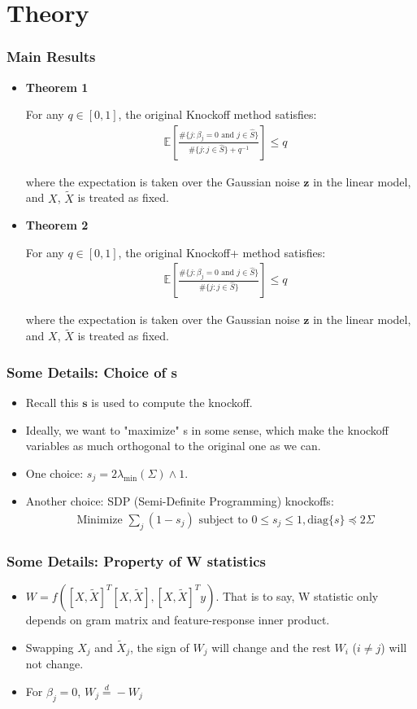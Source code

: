 \documentclass{beamer}
\begin{document}
\section{Theory}
\begin{frame}
\frametitle{Main Results}
\begin{itemize}
	\item \textbf{Theorem 1}
	
	For any $q\in [0,1]$, the original Knockoff method satisfies:
	\begin{align*}
	& \mathbb{E}\left[\frac{\#\{j: \beta_j=0\text{ and }j\in\hat{S} \} }{\#\{j: j\in\hat{S} \} + q^{-1}} \right]\leq q
	\end{align*}
	
	where the expectation is taken over the Gaussian noise $\bm{z}$ in the linear model, and $X$, $\tilde{X}$ is treated as fixed.
	\item \textbf{Theorem 2}
	
	For any $q\in [0,1]$, the original Knockoff+ method satisfies:
	\begin{align*}
	& \mathbb{E}\left[\frac{\#\{j: \beta_j=0\text{ and }j\in\hat{S} \} }{\#\{j: j\in\hat{S} \}} \right]\leq q
	\end{align*}
	
	where the expectation is taken over the Gaussian noise $\bm{z}$ in the linear model, and $X$, $\tilde{X}$ is treated as fixed.
\end{itemize}
\end{frame}

\begin{frame}
\frametitle{Some Details: Choice of s}
\begin{itemize}
\item Recall this $\bm{s}$ is used to compute the knockoff.
\item Ideally, we want to "maximize" s in some sense, which make the knockoff variables as much orthogonal to the original one as we can.
\item One choice: $s_j = 2\lambda_{\min}(\Sigma)\wedge 1$.
\item Another choice: SDP (Semi-Definite Programming) knockoffs:
\begin{align*}
& \text{Minimize }\sum_j (1-s_j) \text{ subject to }0\leq s_j\leq 1, \text{diag}\{s\} \preceq 2\Sigma
\end{align*}
\end{itemize}
\end{frame}

\begin{frame}
\frametitle{Some Details: Property of W statistics}
\begin{itemize}
	\item $W = f([X,\tilde{X}]^T[X,\tilde{X}], [X,\tilde{X}]^Ty)$. That is to say, W statistic only depends on gram matrix and feature-response inner product.
	\item Swapping $X_j$ and $\tilde{X}_j$, the sign of $W_j$ will change and the rest $W_i$ ($i\neq j$) will not change.
	\item For $\beta_j = 0$, $W_j \overset{d}{=} -W_j$
\end{itemize}
\end{frame}
\end{document}
